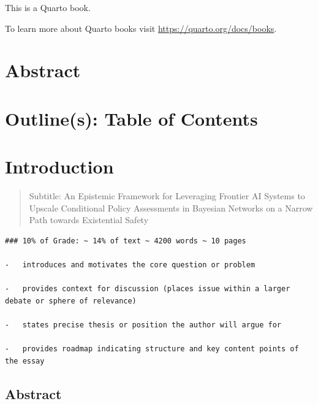 \documentclass[
  11pt,
  letterpaper,
]{book}
\begin{document}

This is a Quarto book.

To learn more about Quarto books visit
\url{https://quarto.org/docs/books}.


\chapter*{Abstract}\label{sec-Abstract}



\chapter*{Outline(s): Table of Contents}\label{sec-ToC}



\chapter{Introduction}\label{introduction}

\begin{quote}
Subtitle: An Epistemic Framework for Leveraging Frontier AI Systems to
Upscale Conditional Policy Assessments in Bayesian Networks on a Narrow
Path towards Existential Safety
\end{quote}

\begin{verbatim}
### 10% of Grade: ~ 14% of text ~ 4200 words ~ 10 pages

-   introduces and motivates the core question or problem

-   provides context for discussion (places issue within a larger debate or sphere of relevance)

-   states precise thesis or position the author will argue for

-   provides roadmap indicating structure and key content points of the essay
\end{verbatim}

\section*{Abstract}\label{sec-abstract}
\end{document}
